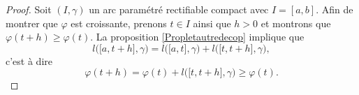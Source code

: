 \begin{proof}
    Soit $(I,\gamma)$ un arc paramétré rectifiable compact avec $I=[a,b]$. Afin de montrer que $\varphi$ est croissante, prenons $t\in I$ ainsi que $h>0$ et montrons que $\varphi(t+h)\geq \varphi(t)$. La proposition \ref{Propletautredecop} implique que 
    \begin{equation}
        l\big( \mathopen[ a , t+h \mathclose],\gamma \big)=l\big( \mathopen[ a ,t  \mathclose],\gamma \big)+l\big( \mathopen[ t , t+h \mathclose],\gamma \big),
    \end{equation}
    c'est à dire 
    \begin{equation}
        \varphi(t+h)=\varphi(t)+l\big( \mathopen[ t , t+h \mathclose],\gamma \big)\geq \varphi(t).
    \end{equation}


\end{proof}
